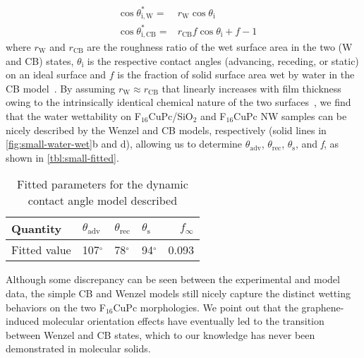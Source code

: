 \begin{eqnarray}
\label{eq:small-2}
&\cos \theta^{*}_{\mathrm{i,W}} =& r_{\mathrm{W}} \cos \theta_{\mathrm{i}} \\
&\cos \theta^{*}_{\mathrm{i,CB}} =& r_{\mathrm{CB}} f \cos \theta_{\mathrm{i}} + f - 1
\end{eqnarray}
where \(r_{\mathrm{W}}\) and \(r_{\mathrm{CB}}\) are the roughness
ratio of the wet surface area in the two (W and CB) states,
\(\theta_{\mathrm{i}}\) is the respective contact angles (advancing,
receding, or static) on an ideal surface and \(f\) is the fraction of
solid surface area wet by water in the CB
model~\cite{Yeh_2008_CBW_hys,McHale_2004,Joanny_1984,Patankar_2010_CBW_hys}.
%
By assuming \(r_{\mathrm{W}} \approx r_{\mathrm{CB}}\) that linearly
increases with film thickness owing to the intrinsically identical
chemical nature of the two surfaces~\cite{Yeh_2008_CBW_hys}, we
find that the water wettability on
F\(_{\text{16}}\)CuPc/SiO\(_{\text{2}}\) and F\(_{\text{16}}\)CuPc NW
samples can be nicely described by the Wenzel and CB models,
respectively (solid lines in \autoref{fig:small-water-wet}b and d), allowing us
to determine \(\theta_{\mathrm{adv}}\), \(\theta_{\mathrm{rec}}\),
\(\theta_{\mathrm{s}}\), and \emph{f}, as shown
in \autoref{tbl:small-fitted}.
%
\begin{table}[!htbp]
\caption{\label{tbl:small-fitted}
Fitted parameters for the dynamic contact angle model described}
\centering
\begin{tabular}{llllr}
\hline
Quantity & \(\theta_{\mathrm{adv}}\) & \(\theta_{\mathrm{rec}}\) & \(\theta_{\mathrm{s}}\) & \(f_{\infty}\) \\
\hline
Fitted value & 107\(^{\circ}\) & 78\(^{\circ}\) & 94\(^{\circ}\) & 0.093 \\
\hline
\end{tabular}
\end{table}
%
Although some discrepancy
can be seen between the experimental and model data, the simple CB
and Wenzel models still nicely capture the distinct wetting behaviors
on the two F\(_{\text{16}}\)CuPc morphologies. We point out that the
graphene-induced molecular orientation effects have eventually led to
the transition between Wenzel and CB states, which to our knowledge
has never been demonstrated in molecular solids.


